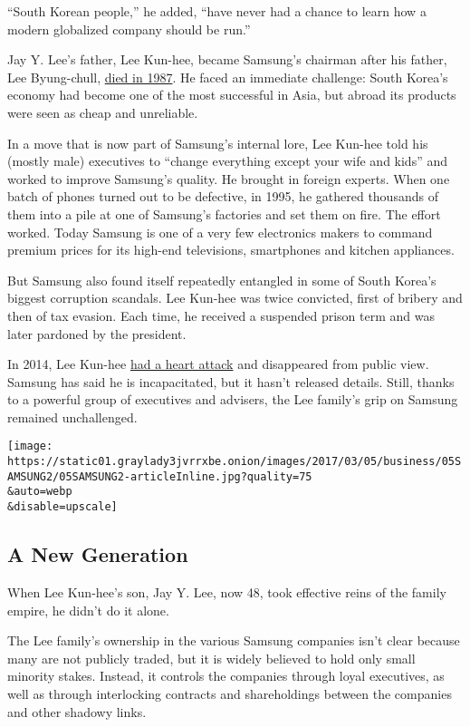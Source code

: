 ``South Korean people,'' he added, ``have never had a chance to learn
how a modern globalized company should be run.''

Jay Y. Lee's father, Lee Kun-hee, became Samsung's chairman after his
father, Lee Byung-chull,
\href{http://www.nytimes3xbfgragh.onion/1987/11/20/obituaries/lee-byung-chull-77-industrialist-of-korea.html}{died
in 1987}. He faced an immediate challenge: South Korea's economy had
become one of the most successful in Asia, but abroad its products were
seen as cheap and unreliable.

In a move that is now part of Samsung's internal lore, Lee Kun-hee told
his (mostly male) executives to ``change everything except your wife and
kids'' and worked to improve Samsung's quality. He brought in foreign
experts. When one batch of phones turned out to be defective, in 1995,
he gathered thousands of them into a pile at one of Samsung's factories
and set them on fire. The effort worked. Today Samsung is one of a very
few electronics makers to command premium prices for its high-end
televisions, smartphones and kitchen appliances.

But Samsung also found itself repeatedly entangled in some of South
Korea's biggest corruption scandals. Lee Kun-hee was twice convicted,
first of bribery and then of tax evasion. Each time, he received a
suspended prison term and was later pardoned by the president.

In 2014, Lee Kun-hee
\href{https://www.nytimes3xbfgragh.onion/2014/05/12/business/international/samsungs-chairman-has-surgery-after-heart-attack.html}{had
a heart attack} and disappeared from public view. Samsung has said he is
incapacitated, but it hasn't released details. Still, thanks to a
powerful group of executives and advisers, the Lee family's grip on
Samsung remained unchallenged.

\texttt{[image: https://static01.graylady3jvrrxbe.onion/images/2017/03/05/business/05SAMSUNG2/05SAMSUNG2-articleInline.jpg?quality=75\\\&auto=webp\\\&disable=upscale]}

\hypertarget{a-new-generation}{%
\subsection{A New Generation}\label{a-new-generation}}

When Lee Kun-hee's son, Jay Y. Lee, now 48, took effective reins of the
family empire, he didn't do it alone.

The Lee family's ownership in the various Samsung companies isn't clear
because many are not publicly traded, but it is widely believed to hold
only small minority stakes. Instead, it controls the companies through
loyal executives, as well as through interlocking contracts and
shareholdings between the companies and other shadowy links.


